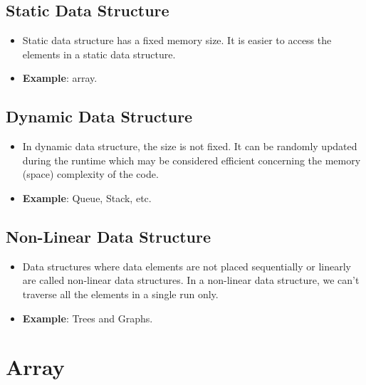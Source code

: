 \subsection{Static Data Structure \cite{gfg-data-structures}}
\begin{itemize}
    \item Static data structure has a fixed memory size. It is easier to access the elements in a static data structure. 

    \item \textbf{Example}: array.
\end{itemize}

\subsection{Dynamic Data Structure \cite{gfg-data-structures}}
\begin{itemize}
    \item In dynamic data structure, the size is not fixed. It can be randomly updated during the runtime which may be considered efficient concerning the memory (space) complexity of the code.

    \item \textbf{Example}: Queue, Stack, etc.
\end{itemize}

\subsection{Non-Linear Data Structure \cite{gfg-data-structures}}
\begin{itemize}
    \item Data structures where data elements are not placed sequentially or linearly are called non-linear data structures. In a non-linear data structure, we can’t traverse all the elements in a single run only.
    
    \item \textbf{Example}: Trees and Graphs.
\end{itemize}

\section{Array \cite{gfg-array-data-structure-guide}}\label{array}

